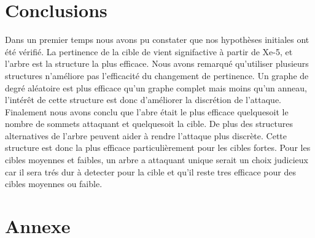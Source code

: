 \documentclass[a4paper,11pt]{article}
\begin{document}
\section{Conclusions}
	Dans un premier temps nous avons pu constater que nos hypothèses initiales ont été vérifié. La pertinence de la cible de vient signifactive à partir de Xe-5, et l'arbre est la structure la plus efficace. Nous avons remarqué qu'utiliser plusieurs structures n'améliore pas l'efficacité du changement de pertinence. Un graphe de degré aléatoire est plus efficace qu'un graphe complet mais moins qu'un anneau, l'intérêt de cette structure est donc d'améliorer la discrétion de l'attaque. Finalement nous avons conclu que l'abre était le plus efficace quelquesoit le nombre de sommets attaquant et quelquesoit la cible. De plus des structures alternatives de l'arbre peuvent aider à rendre l'attaque plus discrète. Cette structure est donc la plus efficace particulièrement pour les cibles fortes. Pour les cibles moyennes et faibles, un arbre a attaquant unique serait un choix judicieux car il sera trés dur à detecter pour la cible et qu'il reste tres efficace pour des cibles moyennes ou faible.

\section{Annexe}
		
		
		

		
\end{document}
